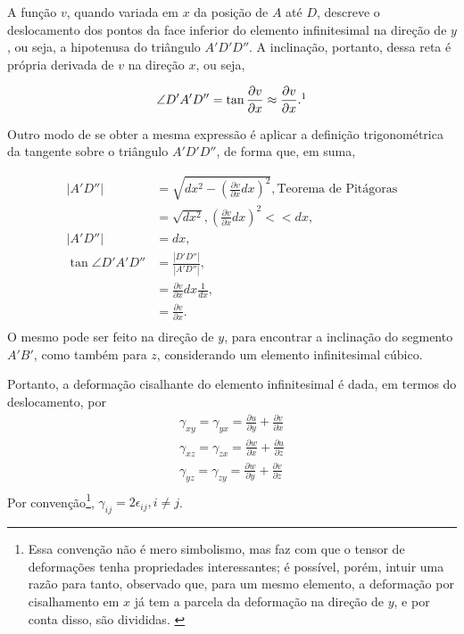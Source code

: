 A função $v$, quando variada em $x$ da posição de $A$ até $D$, descreve o deslocamento dos pontos da face inferior do elemento infinitesimal na direção de $y$, ou seja, a hipotenusa do triângulo $A'D'D''$. A inclinação, portanto, dessa reta é própria derivada de $v$ na direção $x$, ou seja,

\begin{equation}
    \angle D'A'D'' = \tan{\frac{\partial v}{\partial x}} \approx \frac{\partial v}{\partial x}.\footnotemark
\end{equation}

Outro modo de se obter a mesma expressão é aplicar a definição trigonométrica da tangente sobre o triângulo $A'D'D''$, de forma que, em suma,

\begin{align}
    |A'D''|             &= \sqrt{dx^2 -  \left(\frac{\partial v}{\partial x}dx\right)^2}, \text{Teorema de Pitágoras}\\
                         &= \sqrt{dx^2}, \left(\frac{\partial v}{\partial x}dx\right)^2 << dx,\\
    |A'D''|              &= dx,\\
    \tan{\angle D'A'D''} &= \frac{|D'D''|}{|A'D''|}, \\
                         &= \frac{\partial v}{\partial x}dx \frac{1}{dx},\\
                         & = \frac{\partial v}{\partial x}.\\
\end{align}
O mesmo pode ser feito na direção de $y$, para encontrar a inclinação do segmento $A'B'$, como também para $z$, considerando um elemento infinitesimal cúbico.

Portanto, a deformação cisalhante do elemento infinitesimal é dada, em termos do deslocamento, por
\begin{gather}
        \gamma_{xy} = \gamma_{yx} = \frac{\partial u}{\partial y} + \frac{\partial v}{\partial x} \\
        \gamma_{xz} = \gamma_{zx} = \frac{\partial w}{\partial x} + \frac{\partial u}{\partial z} \\
        \gamma_{yz} = \gamma_{zy} = \frac{\partial w}{\partial y} + \frac{\partial v}{\partial z} \\
\end{gather}
Por convenção\footnote{Essa convenção não é mero simbolismo, mas faz com que o tensor de deformações tenha propriedades interessantes; é possível, porém, intuir uma razão para tanto, observado que, para um mesmo elemento, a deformação por cisalhamento em $x$ já tem a parcela da deformação na direção de $y$, e por conta disso, são divididas. \cite{popov} }, $\gamma_{ij} = 2 \epsilon_{ij}, i \neq j$.\cite{roylance} 

